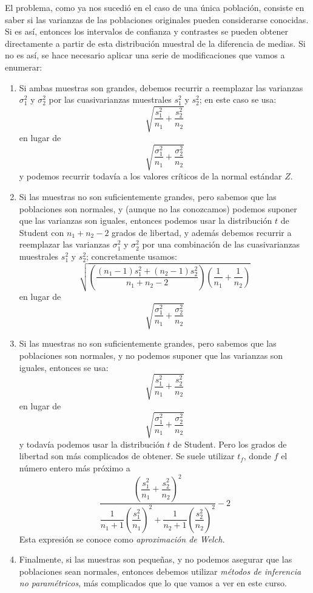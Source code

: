 \begin{itemize}
        El problema, como ya nos sucedió en el caso de una única población, consiste en saber {si las varianzas de las poblaciones originales pueden considerarse conocidas}. Si es así, entonces los intervalos de confianza y contrastes se pueden obtener directamente a partir de esta distribución muestral de la diferencia de medias.  Si no es así, se hace necesario aplicar una serie de modificaciones que vamos a enumerar:
        \begin{enumerate}
            \item {\sf Si ambas  muestras son grandes}, debemos recurrir a reemplazar las varianzas $\sigma_1^2$ y $\sigma_2^2$ por las cuasivarianzas muestrales $s_1^2$ y $s_2^2$;  en este caso se usa:
                \[\sqrt{\dfrac{s_1^2}{n_1}+\dfrac{s_2^2}{n_2}}\]
                en lugar de
                \[\sqrt{\dfrac{\sigma_1^2}{n_1}+\dfrac{\sigma_2^2}{n_2}}\]
                y podemos recurrir todavía a los valores críticos de la normal estándar $Z$.
            \item {\sf Si las muestras no son suficientemente grandes, pero sabemos que las poblaciones son normales, y (aunque no las conozcamos) podemos suponer que las varianzas son iguales}, entonces podemos usar la distribución $t$ de Student con $n_1+n_2-2$ grados de libertad, y además debemos recurrir a reemplazar las varianzas $\sigma_1^2$ y $\sigma_2^2$ por una combinación de las cuasivarianzas muestrales $s_1^2$ y $s_2^2$;  concretamente usamos:
                \[\sqrt{\left(\dfrac{(n_1-1)s_1^2+(n_2-1)s_2^2}{n_1+n_2-2}\right)\left(\dfrac{1}{n_1}+\dfrac{1}{n_2}\right)}\]
                en lugar de \[\sqrt{\dfrac{\sigma_1^2}{n_1}+\dfrac{\sigma_2^2}{n_2}}\]
            \item {\sf Si las muestras no son suficientemente grandes, pero sabemos que las poblaciones son normales, y {\sc no} podemos suponer que las varianzas son iguales}, entonces se usa:
                \[\sqrt{\dfrac{s_1^2}{n_1}+\dfrac{s_2^2}{n_2}}\]
                en lugar de
                \[\sqrt{\dfrac{\sigma_1^2}{n_1}+\dfrac{\sigma_2^2}{n_2}}\]
                y todavía podemos usar la distribución $t$ de Student. Pero los grados de libertad son más complicados de obtener. Se suele utilizar $t_f$, donde $f$ el número entero más próximo a
                \begin{equation}\label{ecu:aproximacionWelch}
                \dfrac{\left(\dfrac{s_1^2}{n_1}+\dfrac{s_2^2}{n_2}\right)^2}{\dfrac{1}{n_1+1}\left(\dfrac{s_1^2}{n_1}\right)^2+\dfrac{1}{n_2+1}\left(\dfrac{s_2^2}{n_2}\right)^2}-2
                \end{equation}
                Esta expresión se conoce como {\em aproximación de Welch.}
            \item Finalmente, si las muestras son pequeñas, y no podemos asegurar que las poblaciones sean normales, entonces debemos utilizar {\em métodos de inferencia no paramétricos}, más complicados que lo que vamos a ver en este curso.
        \end{enumerate}


\end{itemize}
